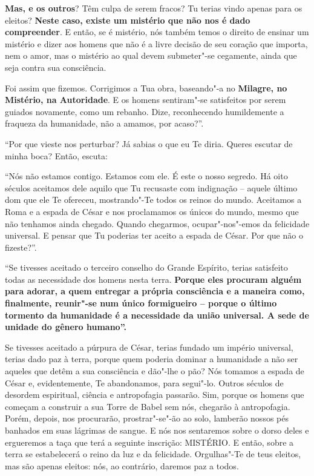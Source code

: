 \textbf{Mas, e os outros}? Têm culpa de serem fracos? Tu terias vindo
apenas para os eleitos? \textbf{Neste caso, existe um mistério que não
nos é dado compreender}. E então, se é mistério, nós também temos o
direito de ensinar um mistério e dizer aos homens que não é a livre
decisão de seu coração que importa, nem o amor, mas o mistério ao qual
devem submeter"-se cegamente, ainda que seja contra sua consciência.

Foi assim que fizemos. Corrigimos a Tua obra, baseando"-a no
\textbf{Milagre, no} \textbf{Mistério, na Autoridade}. E os homens
sentiram"-se satisfeitos por serem guiados novamente, como um rebanho.
Dize, reconhecendo humildemente a fraqueza da humanidade, não a amamos,
por acaso?''.

``Por que vieste nos perturbar? Já sabias o que eu Te diria. Queres
escutar de minha boca? Então, escuta:

``Nós não estamos contigo. Estamos com ele. É este o nosso segredo. Há
oito séculos aceitamos dele aquilo que Tu recusaste com indignação --
aquele último dom que ele Te ofereceu, mostrando"-Te todos os reinos do
mundo. Aceitamos a Roma e a espada de César e nos proclamamos os únicos
do mundo, mesmo que não tenhamos ainda chegado. Quando chegarmos,
ocupar"-nos"-emos da felicidade universal. E pensar que Tu poderias ter
aceito a espada de César. Por que não o fizeste?''.

``Se tivesses aceitado o terceiro conselho do Grande Espírito, terias
satisfeito todas as necessidade dos homens nesta terra. \textbf{Porque
eles procuram alguém para adorar, a quem entregar a própria consciência
e a maneira como, finalmente, reunir"-se num único formigueiro -- porque
o último tormento da humanidade é a necessidade da união universal. A
sede de unidade do gênero humano''.}

Se tivesses aceitado a púrpura de César, terias fundado um império
universal, terias dado paz à terra, porque quem poderia dominar a
humanidade a não ser aqueles que detêm a sua consciência e dão"-lhe o
pão? Nós tomamos a espada de César e, evidentemente, Te abandonamos,
para segui"-lo. Outros séculos de desordem espiritual, ciência e
antropofagia passarão. Sim, porque os homens que começam a construir a
sua Torre de Babel sem nós, chegarão à antropofagia. Porém, depois, nos
procurarão, prostrar"-se"-ão ao solo, lamberão nossos pés banhados em suas
lágrimas de sangue. E nós nos sentaremos sobre o dorso deles e
ergueremos a taça que terá a seguinte inscrição: MISTÉRIO. E então,
sobre a terra se estabelecerá o reino da luz e da felicidade.
Orgulhas"-Te de teus eleitos, mas são apenas eleitos: nós, ao contrário,
daremos paz a todos.

